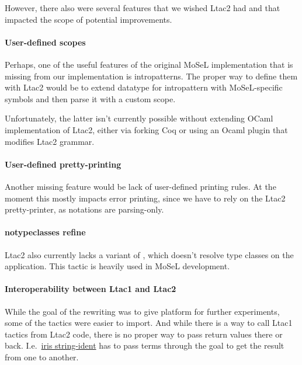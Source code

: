 However, there also were several features that we wished Ltac2 had and that impacted the scope of potential improvements.

\paragraph{User-defined scopes}

Perhaps, one of the useful features of the original MoSeL implementation that is missing from our implementation is intropatterns.
The proper way to define them with Ltac2 would be to extend datatype for intropattern with MoSeL-specific symbols and then parse it with a custom scope.

Unfortunately, the latter isn't currently possible without extending OCaml implementation of Ltac2, either via forking Coq or using an Ocaml plugin that modifies Ltac2 grammar.

\paragraph{User-defined pretty-printing}
Another missing feature would be lack of user-defined printing rules.
At the moment this mostly impacts error printing, since we have to rely on the Ltac2 pretty-printer, as notations are parsing-only.

\paragraph{notypeclasses refine}

Ltac2 also currently lacks a variant of , which doesn't resolve type classes on the application.
This tactic is heavily used in MoSeL development.

\paragraph{Interoperability between Ltac1 and Ltac2}

While the goal of the rewriting was to give platform for further experiments, some of the tactics were easier to import.
And while there is a way to call Ltac1 tactics from Ltac2 code, there is no proper way to pass return values there or back.
I.e.\ \href{https://gitlab.mpi-sws.org/iris/string-ident/}{iris string-ident} has to pass terms through the goal to get the result from one to another.